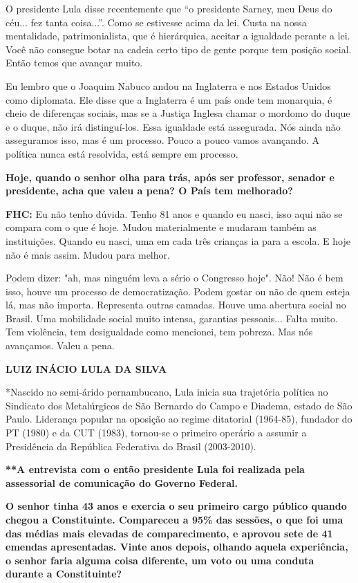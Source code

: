 O presidente Lula disse recentemente que ``o presidente Sarney, meu Deus
do céu... fez tanta coisa...''. Como se estivesse acima da lei. Custa na
nossa mentalidade, patrimonialista, que é hierárquica, aceitar a
igualdade perante a lei. Você não consegue botar na cadeia certo tipo de
gente porque tem posição social. Então temos que avançar muito.

Eu lembro que o Joaquim Nabuco andou na Inglaterra e nos Estados Unidos
como diplomata. Ele disse que a Inglaterra é um país onde tem monarquia,
é cheio de diferenças sociais, mas se a Justiça Inglesa chamar o mordomo
do duque e o duque, não irá distinguí-los. Essa igualdade está
assegurada. Nós ainda não asseguramos isso, mas é um processo. Pouco a
pouco vamos avançando. A política nunca está resolvida, está sempre em
processo.

\textbf{Hoje, quando o senhor olha para trás, após ser professor,
senador e presidente, acha que valeu a pena? O País tem melhorado?}

\textbf{FHC:} Eu não tenho dúvida. Tenho 81 anos e quando eu nasci, isso
aqui não se compara com o que é hoje. Mudou materialmente e mudaram
também as instituições. Quando eu nasci, uma em cada três crianças ia
para a escola. E hoje não é mais assim. Mudou para melhor.

Podem dizer: "ah, mas ninguém leva a sério o Congresso hoje". Não! Não é
bem isso, houve um processo de democratização. Podem gostar ou não de
quem esteja lá, mas não importa. Representa outras camadas. Houve uma
abertura social no Brasil. Uma mobilidade social muito intensa,
garantias pessoais... Falta muito. Tem violência, tem desigualdade como
mencionei, tem pobreza. Mas nós avançamos. Valeu a pena.

\textbf{LUIZ INÁCIO LULA DA SILVA}

*Nascido no semi-árido pernambucano, Lula inicia sua trajetória política
no Sindicato dos Metalúrgicos de São Bernardo do Campo e Diadema, estado
de São Paulo. Liderança popular na oposição ao regime ditatorial
(1964-85), fundador do PT (1980) e da CUT (1983), tornou-se o primeiro
operário a assumir a Presidência da República Federativa do Brasil
(2003-2010).

\textbf{**A entrevista com o então presidente Lula foi realizada pela
assessorial de comunicação do Governo Federal.}

\textbf{O senhor tinha 43 anos e exercia o seu primeiro cargo público
quando chegou a Constituinte. Compareceu a 95\% das sessões, o que foi
uma das médias mais elevadas de comparecimento, e aprovou sete de 41
emendas apresentadas. Vinte anos depois, olhando aquela experiência, o
senhor faria alguma coisa diferente, um voto ou uma conduta durante a
Constituinte?}

